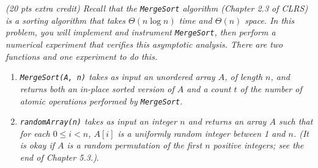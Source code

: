 \documentclass[12pt]{article} \setlength{\oddsidemargin}{0in}
\begin{document}
\section{}
\textit{(20 pts extra credit) Recall that the \texttt{MergeSort} algorithm (Chapter 2.3 of CLRS) is a sorting algorithm that takes $\Theta(n \log n)$ time and $\Theta(n)$ space. In this problem, you will implement and instrument \texttt{MergeSort}, then perform a numerical experiment that verifies this asymptotic analysis. There are two functions and one experiment to do this.}
\begin{enumerate}[label=(\roman*)]
\item\textit{\texttt{MergeSort(A, n)} takes as input an unordered array $A$, of length $n$, and returns both an in-place sorted version of $A$ and a count $t$ of the number of atomic operations performed by \texttt{MergeSort}}.
\item\textit{\texttt{randomArray(n)} takes as input an integer $n$ and returns an array $A$ such that for each $0 \leq i < n$, $A[i]$ is a uniformly random integer between 1 and $n$. (It is okay if $A$ is a random permutation of the first $n$ positive integers; see the end of Chapter 5.3.)}.
\end{enumerate}
\end{document}
